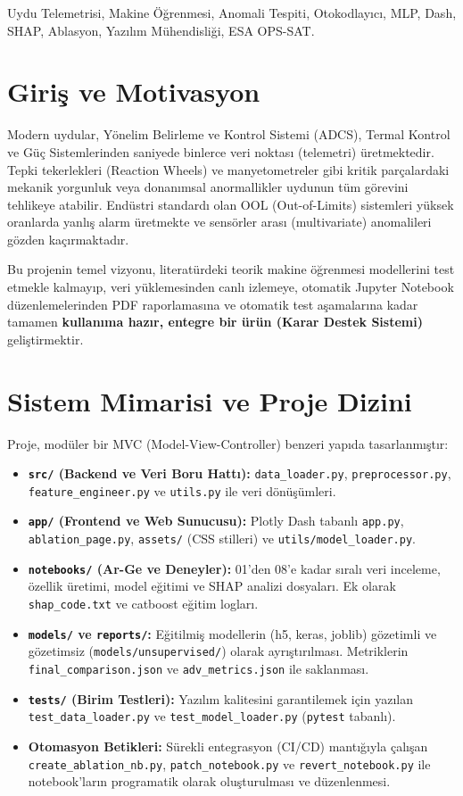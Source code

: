 \documentclass[conference,10pt]{IEEEtran}
\begin{document}
\begin{IEEEkeywords}
Uydu Telemetrisi, Makine Öğrenmesi, Anomali Tespiti, Otokodlayıcı, MLP, Dash, SHAP, Ablasyon, Yazılım Mühendisliği, ESA OPS-SAT.
\end{IEEEkeywords}

\section{Giriş ve Motivasyon}
Modern uydular, Yönelim Belirleme ve Kontrol Sistemi (ADCS), Termal Kontrol ve Güç Sistemlerinden saniyede binlerce veri noktası (telemetri) üretmektedir. Tepki tekerlekleri (Reaction Wheels) ve manyetometreler gibi kritik parçalardaki mekanik yorgunluk veya donanımsal anormallikler uydunun tüm görevini tehlikeye atabilir. Endüstri standardı olan OOL (Out-of-Limits) sistemleri yüksek oranlarda yanlış alarm üretmekte ve sensörler arası (multivariate) anomalileri gözden kaçırmaktadır.

Bu projenin temel vizyonu, literatürdeki teorik makine öğrenmesi modellerini test etmekle kalmayıp, veri yüklemesinden canlı izlemeye, otomatik Jupyter Notebook düzenlemelerinden PDF raporlamasına ve otomatik test aşamalarına kadar tamamen \textbf{kullanıma hazır, entegre bir ürün (Karar Destek Sistemi)} geliştirmektir. 

\section{Sistem Mimarisi ve Proje Dizini}
Proje, modüler bir MVC (Model-View-Controller) benzeri yapıda tasarlanmıştır:
\begin{itemize}
    \item \textbf{\texttt{src/} (Backend ve Veri Boru Hattı):} \texttt{data\_loader.py}, \texttt{preprocessor.py}, \texttt{feature\_engineer.py} ve \texttt{utils.py} ile veri dönüşümleri.
    \item \textbf{\texttt{app/} (Frontend ve Web Sunucusu):} Plotly Dash tabanlı \texttt{app.py}, \texttt{ablation\_page.py}, \texttt{assets/} (CSS stilleri) ve \texttt{utils/model\_loader.py}.
    \item \textbf{\texttt{notebooks/} (Ar-Ge ve Deneyler):} 01'den 08'e kadar sıralı veri inceleme, özellik üretimi, model eğitimi ve SHAP analizi dosyaları. Ek olarak \texttt{shap\_code.txt} ve catboost eğitim logları.
    \item \textbf{\texttt{models/} ve \texttt{reports/}:} Eğitilmiş modellerin (h5, keras, joblib) gözetimli ve gözetimsiz (\texttt{models/unsupervised/}) olarak ayrıştırılması. Metriklerin \texttt{final\_comparison.json} ve \texttt{adv\_metrics.json} ile saklanması.
    \item \textbf{\texttt{tests/} (Birim Testleri):} Yazılım kalitesini garantilemek için yazılan \texttt{test\_data\_loader.py} ve \texttt{test\_model\_loader.py} (\texttt{pytest} tabanlı).
    \item \textbf{Otomasyon Betikleri:} Sürekli entegrasyon (CI/CD) mantığıyla çalışan \texttt{create\_ablation\_nb.py}, \texttt{patch\_notebook.py} ve \texttt{revert\_notebook.py} ile notebook'ların programatik olarak oluşturulması ve düzenlenmesi.
\end{itemize}
\end{document}
